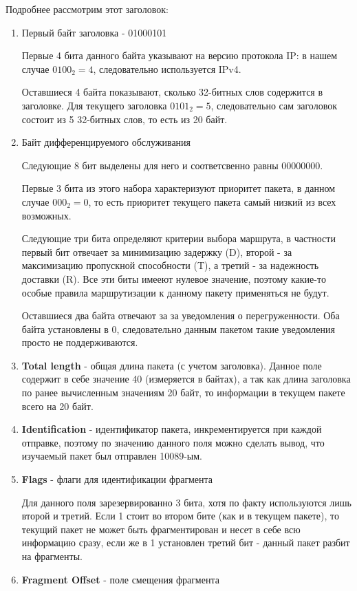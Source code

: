 \documentclass[a4paper]{article}
\begin{document}
  Подробнее рассмотрим этот заголовок:
  \begin{enumerate}
    \item {
      Первый байт заголовка - 01000101

      Первые 4 бита данного байта указывают на версию протокола IP:
      в нашем случае $0100_2 = 4$, следовательно используется IPv4.

      Оставшиеся 4 байта показывают, сколько 32-битных слов содержится в 
      заголовке. Для текущего заголовка $0101_2 = 5$, следовательно сам 
      заголовок состоит из 5 32-битных слов, то есть из 20 байт.
    }
    \item {
      Байт дифференцируемого обслуживания

      Следующие 8 бит выделены для него и соответсвенно равны 
      00000000.
      
      Первые 3 бита из этого набора характеризуют
      приоритет пакета, в данном случае $000_2 = 0$, то есть 
      приоритет текущего пакета самый низкий из всех возможных.
    
      Следующие три бита определяют критерии выбора маршрута,
      в частности первый бит отвечает за минимизацию задержку (D),
      второй - за максимизацию пропускной способности (T), а третий -
      за надежность доставки (R). Все эти биты имееют нулевое значение,
      поэтому какие-то особые правила маршрутизации к данному пакету 
      применяться не будут.

      Оставшиеся два байта отвечают за за уведомления о перегруженности.
      Оба байта установлены в 0, следовательно данным пакетом такие уведомления 
      просто не поддерживаются.
    }
    \item {
      \textbf{Total length} - общая длина пакета (с учетом заголовка).
      Данное поле содержит в себе значение 40 (измеряется в байтах), а так как длина заголовка по 
      ранее вычисленным значениям 20 байт, то информации в текущем пакете всего на 20 байт.
    }
    \item {
      \textbf{Identification} - идентификатор пакета, инкрементируется при каждой
      отправке, поэтому по значению данного поля можно сделать вывод, что изучаемый
      пакет был отправлен 10089-ым.
    }
    \item {
      \textbf{Flags} - флаги для идентификации фрагмента

      Для данного поля зарезервированно 3 бита, хотя по факту используются
      лишь второй и третий. Если 1 стоит во втором бите (как и в текущем пакете),
      то текущий пакет не может быть фрагментирован и несет в себе всю 
      информацию сразу, если же в 1 установлен 
      третий бит - данный пакет разбит на фрагменты.
    }
    \item {
      \textbf{Fragment Offset} - поле смещения фрагмента
      
}
\end{enumerate}
\end{document}
